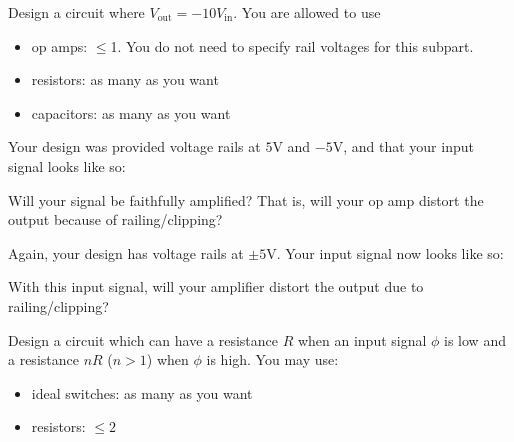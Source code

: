 
\begin{enumerate}
\qitem\label{amp}{
	Design a circuit where $V_\text{out} = -10V_\text{in}$. You are allowed to use
	\begin{itemize}
		\item op amps: $\leq$1. You do not need to specify rail voltages for this subpart.
		\item resistors: as many as you want
		\item capacitors: as many as you want
	\end{itemize}
}

\qitem\label{no_rail}{
	Your design was provided voltage rails at $5\si{\volt}$ and $-5\si{\volt}$, and that your input signal looks like so:
	\begin{center}
		
	\end{center}
	Will your signal be faithfully amplified? That is, will your op amp distort the output because of railing/clipping?
}
\empt{\vspace{2cm}}

\qitem\label{yes_rail}{
	Again, your design has voltage rails at $\pm 5\si{\volt}$. Your input signal now looks like so:
	\begin{center}
		
	\end{center}
	With this input signal, will your amplifier distort the output due to railing/clipping?
}
\empt{\vspace{2cm}}

\qitem\label{resistorDAC}{
	Design a circuit which can have a resistance $R$ when an input signal $\phi$ is low and a resistance $nR$ ($n > 1$) when $\phi$ is high. You may use:
	\begin{itemize}
		\item ideal switches: as many as you want
		\item resistors: $\leq 2$
	\end{itemize}
}
\empt{\vspace{4cm}}


\end{enumerate}
